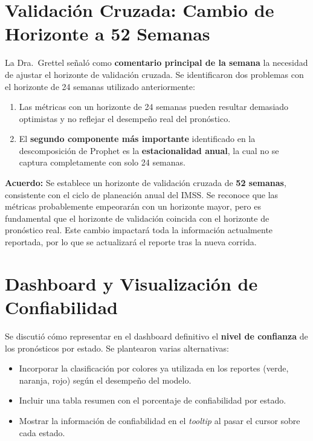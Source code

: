 \documentclass[11pt,letterpaper]{article}
\begin{document}
\section{Validación Cruzada: Cambio de Horizonte a 52 Semanas}

La Dra.\ Grettel señaló como \textbf{comentario principal de la semana} la necesidad de ajustar el horizonte de validación cruzada. Se identificaron dos problemas con el horizonte de 24 semanas utilizado anteriormente:

\begin{enumerate}[leftmargin=2em]
    \item Las métricas con un horizonte de 24 semanas pueden resultar demasiado optimistas y no reflejar el desempeño real del pronóstico.
    \item El \textbf{segundo componente más importante} identificado en la descomposición de Prophet es la \textbf{estacionalidad anual}, la cual no se captura completamente con solo 24 semanas.
\end{enumerate}

\textbf{Acuerdo:} Se establece un horizonte de validación cruzada de \textbf{52 semanas}, consistente con el ciclo de planeación anual del IMSS. Se reconoce que las métricas probablemente empeorarán con un horizonte mayor, pero es fundamental que el horizonte de validación coincida con el horizonte de pronóstico real. Este cambio impactará toda la información actualmente reportada, por lo que se actualizará el reporte tras la nueva corrida.

\section{Dashboard y Visualización de Confiabilidad}

Se discutió cómo representar en el dashboard definitivo el \textbf{nivel de confianza} de los pronósticos por estado. Se plantearon varias alternativas:

\begin{itemize}[leftmargin=2em]
    \item Incorporar la clasificación por colores ya utilizada en los reportes (verde, naranja, rojo) según el desempeño del modelo.
    \item Incluir una tabla resumen con el porcentaje de confiabilidad por estado.
    \item Mostrar la información de confiabilidad en el \textit{tooltip} al pasar el cursor sobre cada estado.
\end{itemize}
\end{document}
